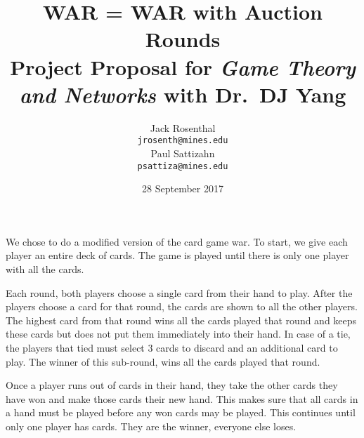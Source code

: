 \documentclass{article}
\title{\textbf{WAR = WAR with Auction Rounds} \\ {\small Project Proposal for
\emph{Game Theory and Networks} with Dr.~DJ Yang}}
\author{%
    Jack Rosenthal \\ {\small\texttt{jrosenth@mines.edu}} \\[12pt]
    Paul Sattizahn \\ {\small\texttt{psattiza@mines.edu}} \\
}
\date{28 September 2017}
\begin{document}
\maketitle


We chose to do a modified version of the card game war.
To start, we give each player an entire deck of cards.
The game is played until there is only one player with all the cards.

Each round, both players choose a single card from their hand to play. After
the players choose a card for that round, the cards are shown to all the other players. The highest
card from that round wins all the cards played that round and keeps these cards
but does not put them immediately into their hand. In case of a tie, the
players that tied must select 3 cards to discard and an additional card to play.
The winner of this sub-round, wins all the cards played that round.

Once a player runs out of cards in their hand, they take the other cards they have
won and make those cards their new hand. This makes sure that all cards in a hand
must be played before any won cards may be played. This continues until only one
player has cards. They are the winner, everyone else loses.
\end{document}
